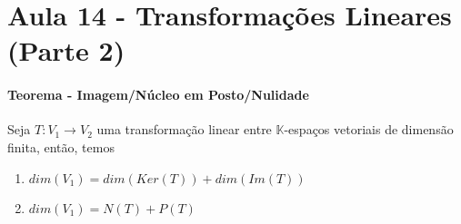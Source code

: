 \documentclass[12pt]{article}
\begin{document}
\newpage
\section*{Aula 14 - Transformações Lineares (Parte 2)}
\paragraph{Teorema - Imagem/Núcleo em Posto/Nulidade\\}
	Seja $T: V_1 \rightarrow V_2$ uma transformação linear entre $\mathbb{K}$-espaços vetoriais de dimensão finita, então, temos
		\begin{enumerate}
		\item $dim(V_1) = dim(Ker(T)) + dim(Im(T))$
		\item $dim(V_1) = N(T) + P(T)$	
		\end{enumerate}
	
\end{document}
